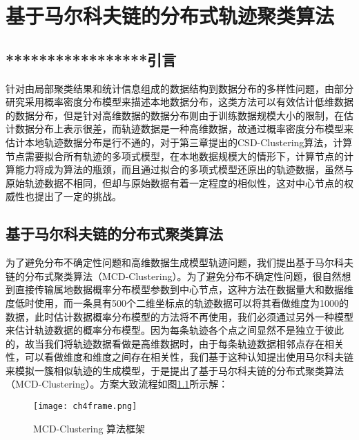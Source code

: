 \chapter{基于马尔科夫链的分布式轨迹聚类算法}


\section{*****************引言}
针对由局部聚类结果和统计信息组成的数据结构到数据分布的多样性问题，由部分研究采用概率密度分布模型来描述本地数据分布，这类方法可以有效估计低维数据的数据分布，但是针对高维数据的数据分布则由于训练数据规模大小的限制，在估计数据分布上表示很差，而轨迹数据是一种高维数据，故通过概率密度分布模型来估计本地轨迹数据分布是行不通的，对于第三章提出的CSD-Clustering算法，计算节点需要拟合所有轨迹的多项式模型，在本地数据规模大的情形下，计算节点的计算能力将成为算法的瓶颈，而且通过拟合的多项式模型还原出的轨迹数据，虽然与原始轨迹数据不相同，但却与原始数据有着一定程度的相似性，这对中心节点的权威性也提出了一定的挑战。

\section{基于马尔科夫链的分布式聚类算法}

为了避免分布不确定性问题和高维数据生成模型轨迹问题，我们提出基于马尔科夫链的分布式聚类算法（MCD-Clustering）。为了避免分布不确定性问题，很自然想到直接传输属地数据概率分布模型参数到中心节点，这种方法在数据量大和数据维度低时使用，而一条具有500个二维坐标点的轨迹数据可以将其看做维度为1000的数据，此时估计数据概率分布模型的方法将不再使用，我们必须通过另外一种模型来估计轨迹数据的概率分布模型。因为每条轨迹各个点之间显然不是独立于彼此的，故当我们将轨迹数据看做是高维数据时，由于每条轨迹数据相邻点存在相关性，可以看做维度和维度之间存在相关性，我们基于这种认知提出使用马尔科夫链来模拟一簇相似轨迹的生成模型，于是提出了基于马尔科夫链的分布式聚类算法（MCD-Clustering）。方案大致流程如图\ref{ch4frame}所示解：
\begin{figure}[h]
	\texttt{[image: ch4frame.png]}
	\caption{MCD-Clustering 算法框架}
	\label{ch4frame}
\end{figure}

